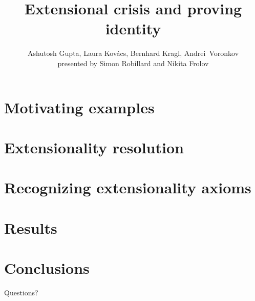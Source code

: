 \documentclass[14pt]{beamer}
\title{Extensional crisis and proving identity}
\author{Ashutosh Gupta, Laura Kovács, Bernhard Kragl, Andrei~Voronkov\\ presented by Simon Robillard and Nikita Frolov}
\institute{}
\date{}
\begin{document}
\begin{frame}
  \maketitle
\end{frame}

\section{Motivating examples}


\section{Extensionality resolution}


\section{Recognizing extensionality axioms}


\section{Results}


\section{Conclusions}


\begin{frame}
  \begin{center}
    \Huge{Questions?}
  \end{center}
\end{frame}
\end{document}
